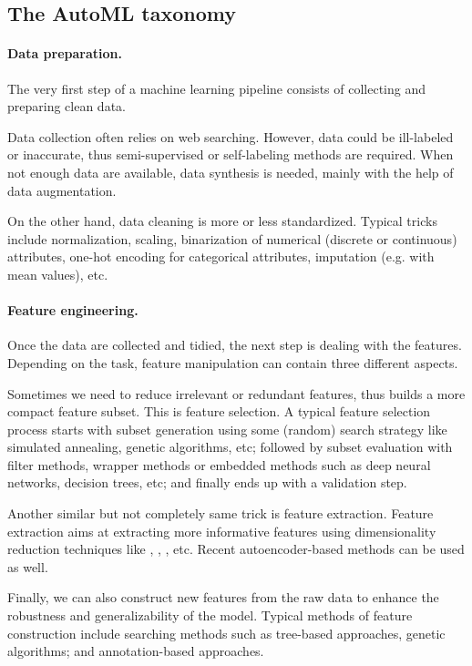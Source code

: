 \subsection{The AutoML taxonomy}\label{sec:dttts.survey.taxonomy}

\paragraph{Data preparation.}
The very first step of a machine learning pipeline consists of collecting and preparing clean data.

Data collection often relies on web searching. However, data could be ill-labeled or inaccurate, thus semi-supervised or self-labeling methods are required. When not enough data are available, data synthesis is needed, mainly with the help of data augmentation.

On the other hand, data cleaning is more or less standardized. Typical tricks include normalization, scaling, binarization of numerical (discrete or continuous) attributes, one-hot encoding for categorical attributes, imputation (e.g. with mean values), etc.

\paragraph{Feature engineering.}
Once the data are collected and tidied, the next step is dealing with the features. Depending on the task, feature manipulation can contain three different aspects.

Sometimes we need to reduce irrelevant or redundant features, thus builds a more compact feature subset. This is feature selection. A typical feature selection process starts with subset generation using some (random) search strategy like simulated annealing, genetic algorithms, etc; followed by subset evaluation with filter methods, wrapper methods or embedded methods such as deep neural networks, decision trees, etc; and finally ends up with a validation step.

Another similar but not completely same trick is feature extraction. Feature extraction aims at extracting more informative features using dimensionality reduction techniques like \PCA, \ICA, \LDA, etc. Recent autoencoder-based methods can be used as well.

Finally, we can also construct new features from the raw data to enhance the robustness and generalizability of the model. Typical methods of feature construction include searching methods such as tree-based approaches, genetic algorithms; and annotation-based approaches.

